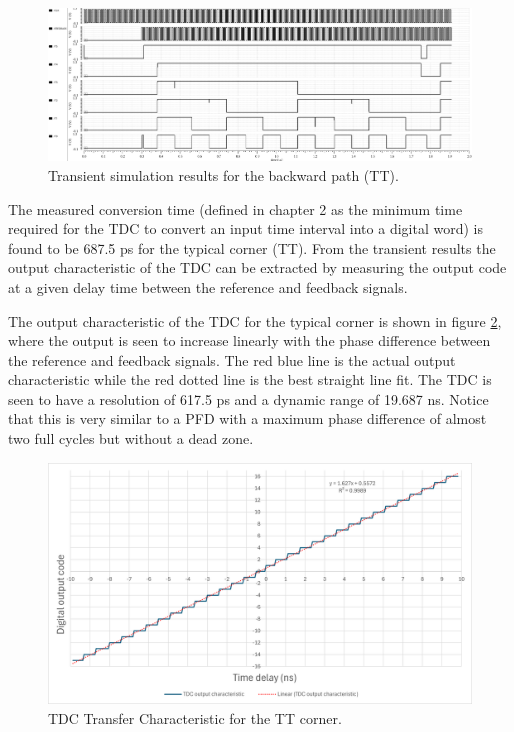 \begin{figure}[H]
    \centering
    \includegraphics[width=1\textwidth]{figures/TDC_TRAN_bwd.png}
    \caption{Transient simulation results for the backward path (TT).}
    \label{fig:TDC_TRAN_bwd}
\end{figure}

The measured conversion time (defined in chapter 2 as the minimum time required for the TDC to convert an input time interval into a digital word) is found to be 687.5 ps for the typical corner (TT). From the
transient results the output characteristic of the TDC can be extracted by measuring the output code at a given delay time between the reference and feedback signals.

The output characteristic of the TDC for the typical corner is shown in figure \ref{fig:TDC_Transfer_Characteristic}, where the output is seen to increase linearly with the phase difference between the
reference and feedback signals. The red blue line is the actual output characteristic while the red dotted line is the best straight line fit. The TDC is seen to have a resolution of 617.5 ps and a dynamic
range of 19.687 ns. Notice that this is very similar to a PFD with a maximum phase difference of almost two full cycles but without a dead zone.

\begin{figure}[H]
    \centering
    \includegraphics[width=1\textwidth]{figures/TDC_output_characteristic_result.png}
    \caption{TDC Transfer Characteristic for the TT corner.}
    \label{fig:TDC_Transfer_Characteristic}
\end{figure}

